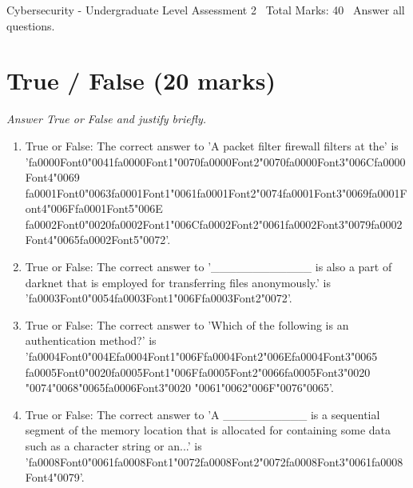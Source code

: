\documentclass[12pt]{article}
\begin{document}
\begin{center}
Cybersecurity - Undergraduate Level Assessment 2 \
Total Marks: 40 \
Answer all questions.
\end{center}

\section*{True / False (20 marks)}
\textit{Answer True or False and justify briefly.}
\begin{enumerate}[label=\arabic*.]
\item True or False: The correct answer to 'A packet filter firewall filters at the' is '{\csname fa0000Font0\endcsname\char"0041}{\csname fa0000Font1\endcsname\char"0070}{\csname fa0000Font2\endcsname\char"0070}{\csname fa0000Font3\endcsname\char"006C}{\csname fa0000Font4\endcsname\char"0069} {\csname fa0001Font0\endcsname\char"0063}{\csname fa0001Font1\endcsname\char"0061}{\csname fa0001Font2\endcsname\char"0074}{\csname fa0001Font3\endcsname\char"0069}{\csname fa0001Font4\endcsname\char"006F}{\csname fa0001Font5\endcsname\char"006E} {\csname fa0002Font0\endcsname\char"0020}{\csname fa0002Font1\endcsname\char"006C}{\csname fa0002Font2\endcsname\char"0061}{\csname fa0002Font3\endcsname\char"0079}{\csname fa0002Font4\endcsname\char"0065}{\csname fa0002Font5\endcsname\char"0072}'.
\item True or False: The correct answer to '\_\_\_\_\_\_\_\_\_\_\_\_ is also a part of darknet that is employed for transferring files anonymously.' is '{\csname fa0003Font0\endcsname\char"0054}{\csname fa0003Font1\endcsname\char"006F}{\csname fa0003Font2\endcsname\char"0072}'.
\item True or False: The correct answer to 'Which of the following is an authentication method?' is '{\csname fa0004Font0\endcsname\char"004E}{\csname fa0004Font1\endcsname\char"006F}{\csname fa0004Font2\endcsname\char"006E}{\csname fa0004Font3\endcsname\char"0065} {\csname fa0005Font0\endcsname\char"0020}{\csname fa0005Font1\endcsname\char"006F}{\csname fa0005Font2\endcsname\char"0066}{\csname fa0005Font3\endcsname\char"0020} {\char"0074}{\char"0068}{\char"0065}{\csname fa0006Font3\endcsname\char"0020} {\char"0061}{\char"0062}{\char"006F}{\char"0076}{\char"0065}'.
\item True or False: The correct answer to 'A \_\_\_\_\_\_\_\_\_\_ is a sequential segment of the memory location that is allocated for containing some data such as a character string or an...' is '{\csname fa0008Font0\endcsname\char"0061}{\csname fa0008Font1\endcsname\char"0072}{\csname fa0008Font2\endcsname\char"0072}{\csname fa0008Font3\endcsname\char"0061}{\csname fa0008Font4\endcsname\char"0079}'.

\end{enumerate}
\end{document}
